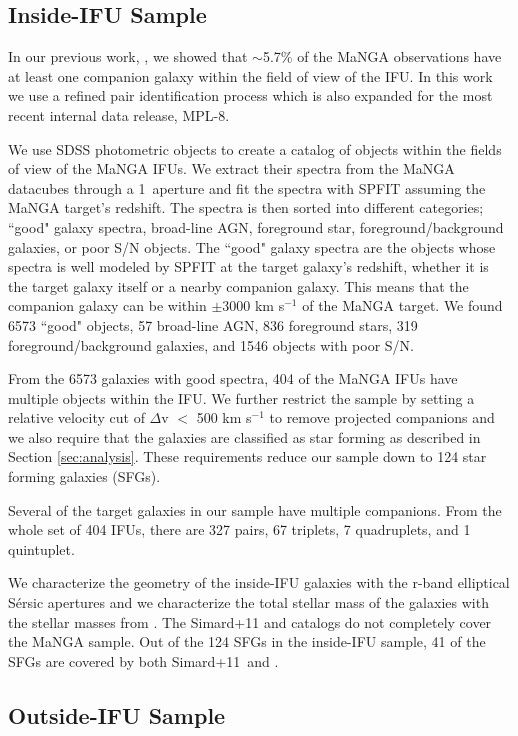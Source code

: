 \documentclass[iop,revtex4,twocolumn,apj,numberedappendix,appendixfloats]{emulateapj}
\newcommand{\simard}{Simard+11}
\begin{document}
\subsection{Inside-IFU Sample}\label{sec:inside}
In our previous work, \citet{Fu:2018}, we showed that $\sim$5.7\% of the MaNGA observations have at least one companion galaxy within the field of view of the IFU. In this work we use a refined pair identification process which is also expanded for the most recent internal data release, MPL-8.

We use SDSS photometric objects to create a catalog of objects within the fields of view of the MaNGA IFUs. We extract their spectra from the MaNGA datacubes through a 1\arcsec\ aperture and fit the spectra with {\sc SPFIT} assuming the MaNGA target's redshift. The spectra is then sorted into different categories; ``good" galaxy spectra, broad-line AGN, foreground star, foreground/background galaxies, or poor S/N objects. The ``good" galaxy spectra are the objects whose spectra is well modeled by {\sc SPFIT} at the target galaxy's redshift, whether it is the target galaxy itself or a nearby companion galaxy. This means that the companion galaxy can be within $\pm$3000 km s$^{-1}$ of the MaNGA target. We found 6573 ``good" objects, 57 broad-line AGN, 836 foreground stars, 319 foreground/background galaxies, and 1546 objects with poor S/N. 

From the 6573 galaxies with good spectra, 404 of the MaNGA IFUs have multiple objects within the IFU. We further restrict the sample by setting a relative velocity cut of $\Delta$v $<$ 500 km s$^{-1}$ to remove projected companions and we also require that the galaxies are classified as star forming as described in Section \ref{sec:analysis}. These requirements reduce our sample down to 124 star forming galaxies (SFGs). 

Several of the target galaxies in our sample have multiple companions. From the whole set of 404 IFUs, there are 327 pairs, 67 triplets, 7 quadruplets, and 1 quintuplet.  

We characterize the geometry of the inside-IFU galaxies with the r-band elliptical S\'ersic apertures and we characterize the total stellar mass of the galaxies with the stellar masses from \citet{Mendel:2014}. The Simard+11 and \citet{Mendel:2014} catalogs do not completely cover the MaNGA sample. Out of the 124 SFGs in the inside-IFU sample, 41 of the SFGs are covered by both \simard\ and \citet{Mendel:2014}.

\subsection{Outside-IFU Sample}\label{sec:outside}
\end{document}
